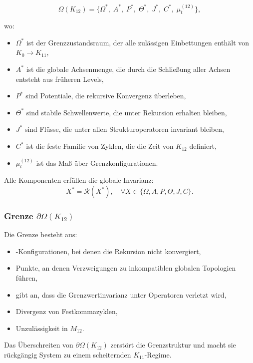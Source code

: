 \[
\Omega(K_{12}) =
\{
\Omega^*,\;
A^*,\;
P^*,\;
\Theta^*,\;
J^*,\;
C^*,\;
\mu^{(12)}_t
\},
\]

wo:
\begin{itemize}
    \item $\Omega^*$ ist der Grenzzustandsraum, der alle zulässigen Einbettungen enthält
          von $K_0\!\to\!K_{11}$,
    \item $A^*$ ist die globale Achsenmenge, die durch die Schließung aller Achsen entsteht
          aus früheren Levels,
    \item $P^*$ sind Potentiale, die rekursive Konvergenz überleben,
    \item $\Theta^*$ sind stabile Schwellenwerte, die unter Rekursion erhalten bleiben,
    \item $J^*$ sind Flüsse, die unter allen Strukturoperatoren invariant bleiben,
    \item $C^*$ ist die feste Familie von Zyklen, die die Zeit von $K_{12}$ definiert,
    \item $\mu^{(12)}_t$ ist das Maß über Grenzkonfigurationen.
\end{itemize}

Alle Komponenten erfüllen die globale Invarianz:
\[
X^* = \mathcal{R}(X^*),\quad \forall X \in \{\Omega, A, P, \Theta, J, C\}.
\]

\subsubsection{Grenze $\partial\Omega(K_{12})$}

Die Grenze besteht aus:
\begin{itemize}
    \item-Konfigurationen, bei denen die Rekursion nicht konvergiert,
    \item Punkte, an denen Verzweigungen zu inkompatiblen globalen Topologien führen,
    \item gibt an, dass die Grenzwertinvarianz unter Operatoren verletzt wird,
    \item Divergenz von Festkommazyklen,
    \item Unzulässigkeit in $M_{12}$.
\end{itemize}

Das Überschreiten von $\partial\Omega(K_{12})$ zerstört die Grenzstruktur und macht sie rückgängig
System zu einem scheiternden $K_{11}$-Regime.

